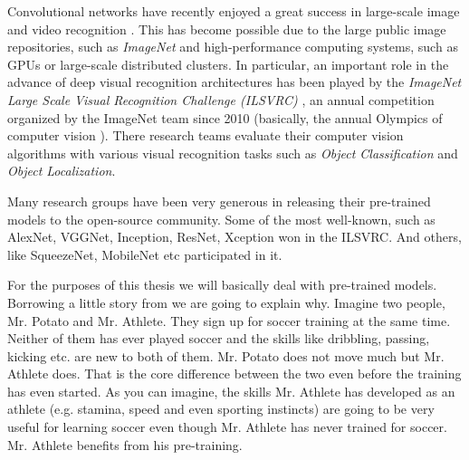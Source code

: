 \documentclass[12pt,a4paper]{report}
\newcommand{\term}{\textit}
\newcommand{\acronym}{\MakeUppercase}
\begin{document}
	Convolutional networks have recently enjoyed a great success in large-scale image 
	and video recognition \citep{Simonyan_vgg}. This has become possible due to the large 
	public image repositories, such as \term{ImageNet} \citep{Deng} and high-performance 
	computing systems, such as \acronym{gpu}s or large-scale distributed clusters. In 
	particular, an important role in the advance of deep visual recognition architectures 
	has been played by the \term{ImageNet Large Scale Visual Recognition Challenge 
	(\acronym{ilsvrc})} \citep{Russakovsky}, an annual competition organized by the 
	ImageNet team since 2010 (basically, the annual Olympics of computer vision \citep{Deshpande}). 
	There research teams evaluate their computer vision algorithms with various visual 
	recognition tasks such as \term{Object Classification} and \term{Object Localization}.
	\par
	Many research groups have been very generous in releasing their pre-trained 
	models to the open-source community. Some of the most well-known, such as AlexNet, 
	VGGNet, Inception, ResNet, Xception \citep{Krizhevsky_alexnet, Simonyan_vgg, 
	Szegedy_inception, He_resnet, Chollet_xception} won in the \acronym{ilsvrc}. 
	And others, like SqueezeNet, MobileNet \citep{Iandola_squeezenet, Howard_mobilenet} 
	etc participated in it.
	\par
	For the purposes of this thesis we will basically deal with pre-trained models. 
	Borrowing a little story from \citet{Gupta} we are going to explain why. Imagine two 
	people, Mr. Potato and Mr. Athlete. They sign up for soccer training at the same time. 
	Neither of them has ever played soccer and the skills like dribbling, passing, 
	kicking etc. are new to both of them. Mr. Potato does not move much but Mr. Athlete 
	does. That is the core difference between the two even before the training has even 
	started. As you can imagine, the skills Mr. Athlete has developed as an athlete 
	(e.g. stamina, speed and even sporting instincts) are going to be very useful for 
	learning soccer even though Mr. Athlete has never trained for soccer. Mr. Athlete 
	benefits from his pre-training.
	\\
	
\end{document}

